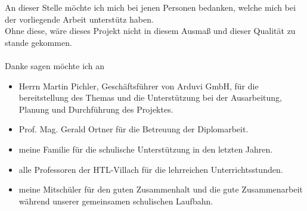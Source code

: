 An dieser Stelle möchte ich mich bei jenen Personen bedanken, 
welche mich bei der vorliegende Arbeit unterstütz haben.
\\
Ohne diese, wäre dieses Projekt nicht in diesem Ausmaß und dieser Qualität zu stande gekommen.
\\\\
Danke sagen möchte ich an
\begin{itemize}
    \item Herrn Martin Pichler, Geschäftsführer von Arduvi GmbH, für die bereitstellung des Themas und 
    die Unterstützung bei der Ausarbeitung, Planung und Durchführung des Projektes.
    \item Prof. Mag. Gerald Ortner für die Betreuung der Diplomarbeit.
    \item meine Familie für die schulische Unterstützung in den letzten Jahren.
    \item alle Professoren der HTL-Villach für die lehrreichen Unterrichtsstunden.
    \item meine Mitschüler für den guten Zusammenhalt und die gute Zusammenarbeit während 
    unserer gemeinsamen schulischen Laufbahn.
\end{itemize}